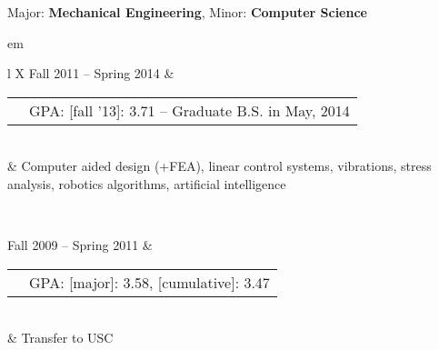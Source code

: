 

{\centering \large{Major: \textbf{Mechanical Engineering}, Minor: \textbf{Computer Science}} \par }

	
{ em
\begin{tabu}{ L{\tabularIndent} X } \hhline{==}
	Fall 2011 -- Spring 2014 & 
	\begin{tabular}{ l | l }
		\mysubsection{University of Southern California} & GPA: [fall '13]: 3.71 -- Graduate B.S. in May, 2014 \\ \cline{1-1}
	\end{tabular}
	\\
	&
	Computer aided design (+FEA), linear control systems, vibrations, stress analysis, robotics algorithms, artificial intelligence

\\ \hhline{==}

	Fall 2009 -- Spring 2011 & 
	\begin{tabular}{ l | l }
		\mysubsection{University of Massachusetts, Amherst} & GPA: [major]: 3.58, [cumulative]: 3.47 \\ \cline{1-1}
	\end{tabular}
	\\
	& Transfer to USC
\end{tabu}}